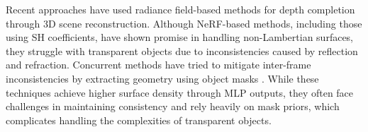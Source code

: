 Recent approaches have used radiance field-based methods \cite{ichnowski-2022-corl, kerr-2022-corl, duisterhof2024residualnerf} for depth completion through 3D scene reconstruction. Although \ac{NeRF}-based methods, including those using \ac{SH} coefficients, have shown promise in handling non-Lambertian surfaces, they struggle with transparent objects due to inconsistencies caused by reflection and refraction. Concurrent methods have tried to mitigate inter-frame inconsistencies by extracting geometry using object masks \cite{chen2023nerrf, ummadisingu2024said}. While these techniques achieve higher surface density through MLP outputs, they often face challenges in maintaining consistency and rely heavily on mask priors, which complicates handling the complexities of transparent objects.